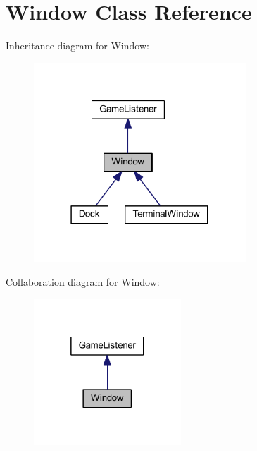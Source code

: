 \hypertarget{class_window}{}\section{Window Class Reference}
\label{class_window}


Inheritance diagram for Window\+:\nopagebreak
\begin{figure}[H]
\begin{center}
\leavevmode
\includegraphics[width=226pt]{class_window__inherit__graph}
\end{center}
\end{figure}


Collaboration diagram for Window\+:\nopagebreak
\begin{figure}[H]
\begin{center}
\leavevmode
\includegraphics[width=157pt]{class_window__coll__graph}
\end{center}
\end{figure}

